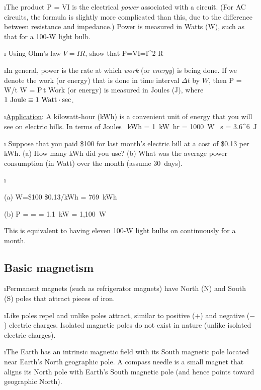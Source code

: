 \i The product 
%
\be
P = VI
\ee
%
is the electrical {\em power} associated with a circuit.
(For AC circuits, the formula is slightly more complicated than this,
due to the difference between resistance and impedance.)
Power is measured in Watts (W), such as that for a 100-W light bulb.

\i \exer
Using Ohm's law $V=IR$, show that
%
\be
P=VI=I^2 R 
\ee

\i In general, power is the rate at which {\em work} (or {\em energy})
is  being done. 
If we denote the work (or energy) that is done in 
time interval $\Delta t$ by $W$, then
%
\be
P = W/\Delta t
\quad
W = P\,\Delta t
\ee
%
Work (or energy) is measured in Joules (J), where 
$1~{\rm Joule} \equiv 1~{\rm Watt}\cdot{\rm sec}$.

\i \underline{Application}: 
A kilowatt-hour (kWh) is a convenient unit of 
energy that you will see on electric bills.
In terms of Joules
%
~{\rm kWh}
= 1~{\rm kW}~{\rm hr}
= 1000~{\rm W} ~{\rm s}
= 3.6^6~{\rm J}
\ee

\i \exer 
Suppose that you paid \$100 for last month's electric bill
at a cost of \$0.13 per kWh.
(a) How many kWh did you use? 
(b) What was the average power consumption (in Watt) over 
the month (assume 30~days).

\i \ans

(a) 
\be 
W=\$100 \div \$0.13/{\rm kWh} = 769~{\rm kWh}
\ee 

(b)
\be
P =  
=  
= 1.1~{\rm kW} 
= 1,100~{\rm W}
\ee

This is equivalent to having eleven 100-W light bulbs 
on continuously for a month.
 
\ei

%
\subsection{Basic magnetism}

\bi

\i Permanent magnets (such as refrigerator magnets) have 
North (N) and South (S) poles that attract pieces of iron.

\i Like poles repel and unlike poles attract,
similar to positive (+) and negative ($-$) electric charges.
Isolated magnetic poles do not exist in nature (unlike isolated
electric charges).

\i The Earth has an intrinsic magnetic field with its South 
magnetic pole located near Earth's North geographic pole.
A compass needle is a small magnet that aligns its North pole
with Earth's South magnetic pole (and hence points toward geographic
North).

